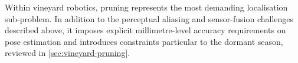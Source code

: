 Within vineyard robotics, pruning represents the most demanding localisation sub-problem. In addition to the perceptual aliasing and sensor-fusion challenges described above, it imposes explicit millimetre-level accuracy requirements on pose estimation and introduces constraints particular to the dormant season, reviewed in \cref{sec:vineyard-pruning}.